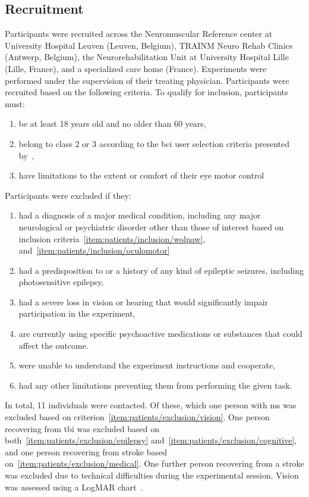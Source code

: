 \subsection{Recruitment}
Participants were recruited across the Neuromuscular Reference center at
University Hospital Leuven (Leuven, Belgium), TRAINM Neuro Rehab Clinics
(Antwerp, Belgium), the Neurorehabilitation Unit at University Hospital Lille
(Lille, France), and a specialized care home (France).
Experiments were performed under the supervision of their treating physician.
Participants were recruited based on the following criteria.
To qualify for inclusion, participants must:
\begin{enumerate}
	\item be at least 18 years old and no older than 60
	years,
  \item belong to class 2 or 3 according to the \ac{bci}	user selection criteria
    presented by~\textcite{Wolpaw2006},\label{item:patients/inclusion/wolpaw}
  \item have limitations to the extent or comfort of their eye motor control\label{item:patients/inclusion/oculomotor}
\end{enumerate}
Participants were excluded if they:
\begin{enumerate}
  \item had a diagnosis of a major medical condition, including any major
    neurological or psychiatric disorder other than those of interest based on
    inclusion criteria~\ref{item:patients/inclusion/wolpaw},
    and~\ref{item:patients/inclusion/oculomotor}\label{item:patients/exclusion/medical}
  \item had a predisposition to or a history of any kind of epileptic seizures,
    including photosensitive epilepsy,\label{item:patients/exclusion/epilepsy}
  \item had a severe loss in vision or hearing that would significantly impair
        participation in the experiment,\label{item:patients/exclusion/vision}
  \item are currently using specific psychoactive medications or substances that could affect the outcome.\label{item:patients/exclusion/cognitive}
  \item were unable to understand the experiment instructions and cooperate,
  \item had any other limitations preventing them from performing the given task.
\end{enumerate}

In total, 11 individuals were contacted. Of these, which one person with
\ac{ms} was excluded based on criterion~\ref{item:patients/exclusion/vision}.
One person recovering from \ac{tbi} was excluded based on both~\ref{item:patients/exclusion/epilepsy}
and~\ref{item:patients/exclusion/cognitive}, and one person recovering from
stroke based on~\ref{item:patients/exclusion/medical}.
One further person recovering from a stroke was excluded due to technical
difficulties during the experimental session.
Vision was assessed using a LogMAR chart~\cite{Bailey1976}.

